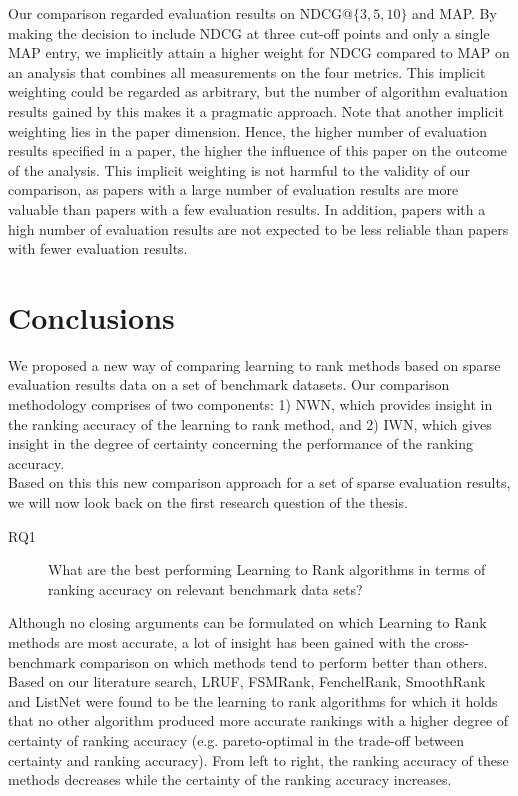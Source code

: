 Our comparison regarded evaluation results on \ac{NDCG}@$\{3,5,10\}$ and \ac{MAP}. By making the decision to include \ac{NDCG} at three cut-off points and only a single \ac{MAP} entry, we implicitly attain a higher weight for \ac{NDCG} compared to \ac{MAP} on an analysis that combines all measurements on the four metrics. This implicit weighting could be regarded as arbitrary, but the number of algorithm evaluation results gained by this makes it a pragmatic approach. Note that another implicit weighting lies in the paper dimension. Hence, the higher number of evaluation results specified in a paper, the higher the influence of this paper on the outcome of the analysis. This implicit weighting is not harmful to the validity of our comparison, as papers with a large number of evaluation results are more valuable than papers with a few evaluation results. In addition, papers with a high number of evaluation results are not expected to be less reliable than papers with fewer evaluation results.

\section{Conclusions}
We proposed a new way of comparing learning to rank methods based on sparse evaluation results data on a set of benchmark datasets. Our comparison methodology comprises of two components: 1) \ac{NWN}, which provides insight in the ranking accuracy of the learning to rank method, and 2) \ac{IWN}, which gives insight in the degree of certainty concerning the performance of the ranking accuracy.\\

Based on this this new comparison approach for a set of sparse evaluation results, we will now look back on the first research question of the thesis.
\begin{description}
\item[RQ1] What are the best performing Learning to Rank algorithms in terms of ranking accuracy on relevant benchmark data sets?\\
\end{description}
Although no closing arguments can be formulated on which Learning to Rank methods are most accurate, a lot of insight has been gained with the cross-benchmark comparison on which methods tend to perform better than others.\\

Based on our literature search, LRUF, FSMRank, FenchelRank, SmoothRank and ListNet were found to be the learning to rank algorithms for which it holds that no other algorithm produced more accurate rankings with a higher degree of certainty of ranking accuracy (e.g. pareto-optimal in the trade-off between certainty and ranking accuracy). From left to right, the ranking accuracy of these methods decreases while the certainty of the ranking accuracy increases.\\


